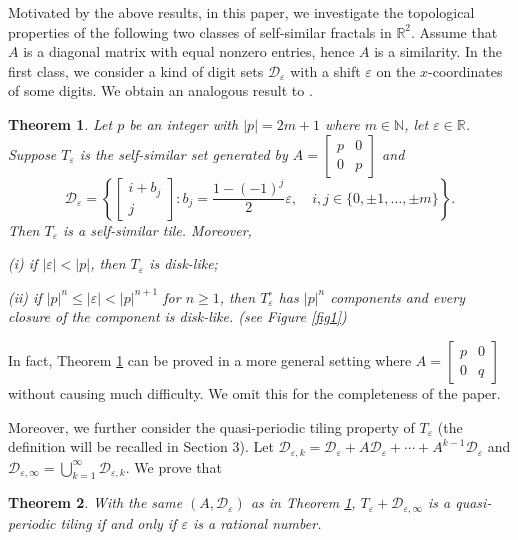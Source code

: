 \documentclass[12pt, reqno]{amsart}
\newtheorem{theorem}{Theorem}[section]
\numberwithin{equation}{section}
\begin{document}
Motivated by the above results, in this paper, we investigate the topological properties of the following two classes of self-similar fractals in $\mathbb{R}^2$. Assume that $A$ is a diagonal matrix with equal nonzero entries, hence $A$ is a similarity. In the first class, we consider a kind of  digit sets ${\mathcal D}_\varepsilon$ with a shift $\varepsilon$  on the $x$-coordinates of some digits. We obtain an analogous result to \cite{DeLa}.

\begin{theorem}\label{mainthm}
Let $p$ be an integer with $|p|=2m+1$ where $m\in {\mathbb N}$, let $\varepsilon\in {\mathbb R}$. Suppose $T_\varepsilon$ is the self-similar set generated by  $A=\left[\begin{array}{cc}
p& 0 \\
0 & p
\end{array}\right]$ and
$${\mathcal D}_\varepsilon=\left\{\left[\begin{array}{c}
i+b_j\\
j
\end{array}\right]: b_j=\frac{1-(-1)^j}{2}\varepsilon, \quad i, j\in \{0,\pm 1, \dots, \pm m\}\right\}.$$ Then $T_\varepsilon$ is a self-similar tile. Moreover,

(i) if $|\varepsilon|<|p|$, then $T_\varepsilon$ is disk-like;

(ii) if $|p|^n\leq |\varepsilon|<|p|^{n+1}$ for $n\geq 1$, then $T_{\varepsilon}^\circ$ has $|p|^n$ components and every closure of the component is disk-like. (see Figure \ref{fig1})
\end{theorem}

In fact, Theorem \ref{mainthm} can be proved in a more general setting where $A=\left[\begin{array}{cc}
p& 0 \\
0 & q
\end{array}\right]$ without causing much difficulty. We omit this for the completeness of the paper.

Moreover, we further consider the quasi-periodic tiling property of  $T_\varepsilon$ (the definition will be recalled in Section 3). Let ${\mathcal D}_{\varepsilon,k}={\mathcal D}_\varepsilon+ A{\mathcal D}_\varepsilon+\cdots+ A^{k-1}{\mathcal D}_\varepsilon$ and ${\mathcal D}_{\varepsilon,\infty}=\bigcup_{k=1}^\infty{\mathcal D}_{\varepsilon,k}$. We prove that

\begin{theorem}\label{mainthm2}
With the same $(A, {\mathcal D}_\varepsilon)$ as in Theorem \ref{mainthm}, $T_\varepsilon+{\mathcal D}_{\varepsilon,\infty}$ is a quasi-periodic tiling if and only if $\varepsilon$ is a rational number.
\end{theorem}
\end{document}
